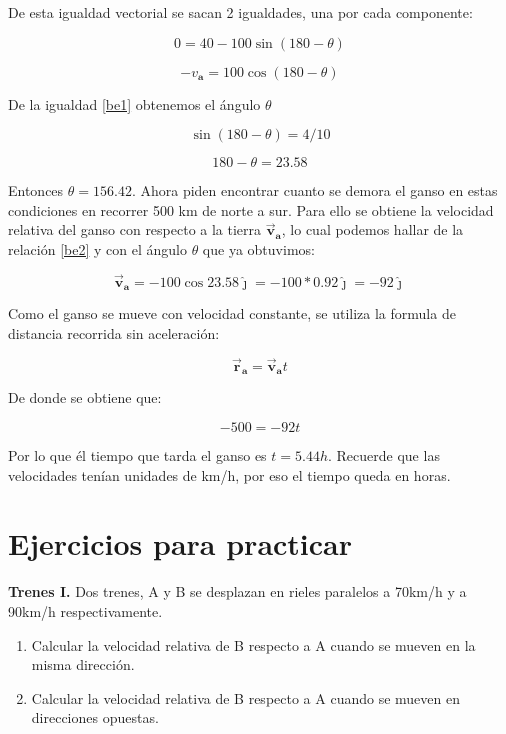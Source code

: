 \documentclass[a4paper,11pt]{article}
\begin{document}
	De esta igualdad vectorial se sacan 2 igualdades, una por cada componente:
	
	\begin{equation}\label{be1}
	0 = 40 -100 \sin (180-\theta)
	\end{equation}
	
	\begin{equation}\label{be2}
	-v_{\textbf{a}} = 100\cos (180-\theta)
	\end{equation}
	
	De la igualdad \ref{be1} obtenemos el ángulo $\theta$
	
	$$  \sin (180-\theta) = 4/10 $$ 
	
	$$   180-\theta = 23.58 $$ 
	
	
	Entonces $\theta= 156.42 $. Ahora piden encontrar cuanto se demora el ganso en estas condiciones en recorrer 500 km de norte a sur. Para ello se obtiene la velocidad relativa del ganso con respecto a la tierra  $\vec{\textbf{v}}_{\textbf{a}}$, lo cual podemos hallar de la relación \ref{be2} y con el ángulo $\theta$ que ya obtuvimos:
	
	\begin{equation}
	\vec{\textbf{v}}_{\textbf{a}} = -100 \cos 23.58 \boldsymbol{\hat{\jmath}} = -100 * 0.92 \boldsymbol{\hat{\jmath}} = -92 \boldsymbol{\hat{\jmath}}
	\end{equation}
	
	
	Como el ganso se mueve con velocidad constante, se utiliza la formula de distancia recorrida sin aceleración:
	
	\begin{equation}
	\vec{\textbf{r}}_{\textbf{a}} =  \vec{\textbf{v}}_{\textbf{a}} t
	\end{equation}
	
	De donde se obtiene que:
	
	$$ -500 = -92 t$$
	
	Por lo que él tiempo que tarda el ganso es $t=5.44 h$. Recuerde que las velocidades tenían unidades de km/h, por eso el tiempo queda en horas.
	\pagebreak
	
	\section{Ejercicios para practicar}
	
	\color{pr}
	\textbf{Trenes I. }\color{black} Dos trenes, A y B se desplazan en rieles paralelos a 70km/h y a 90km/h respectivamente. 
	
	
\begin{enumerate}
		\item Calcular la velocidad relativa de B respecto a A cuando se mueven en la misma dirección.
\item Calcular la velocidad relativa de B respecto a A cuando se mueven en direcciones opuestas.
\end{enumerate}
	
\end{document}
